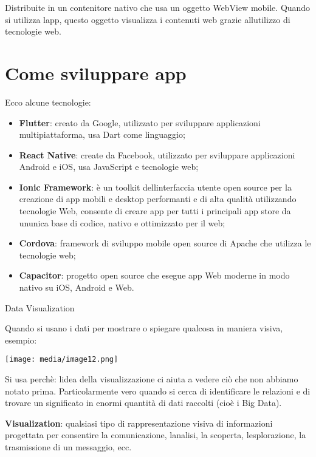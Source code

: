 Distribuite in un contenitore nativo che usa un oggetto WebView mobile.
Quando si utilizza l\textquotesingle app, questo oggetto visualizza i
contenuti web grazie all\textquotesingle utilizzo di tecnologie web.

\section{Come sviluppare app}\label{come-sviluppare-app}

Ecco alcune tecnologie:

\begin{itemize}
\item
  \textbf{Flutter}: creato da Google, utilizzato per sviluppare
  applicazioni multipiattaforma, usa Dart come linguaggio;
\item
  \textbf{React Native}: create da Facebook, utilizzato per sviluppare
  applicazioni Android e iOS, usa JavaScript e tecnologie web;
\item
  \textbf{Ionic Framework}: è un toolkit
  dell\textquotesingle interfaccia utente open source per la creazione
  di app mobili e desktop performanti e di alta qualità utilizzando
  tecnologie Web, consente di creare app per tutti i principali app
  store da un\textquotesingle unica base di codice, nativo e ottimizzato
  per il web;
\item
  \textbf{Cordova}: framework di sviluppo mobile open source di Apache
  che utilizza le tecnologie web;
\item
  \textbf{Capacitor}: progetto open source che esegue app Web moderne in
  modo nativo su iOS, Android e Web.
\end{itemize}

Data Visualization

Quando si usano i dati per mostrare o spiegare qualcosa in maniera
visiva, esempio:

\texttt{[image: media/image12.png]}

Si usa perchè: l\textquotesingle idea della visualizzazione ci aiuta a
vedere ciò che non abbiamo notato prima. Particolarmente vero quando si
cerca di identificare le relazioni e di trovare un significato in enormi
quantità di dati raccolti (cioè i Big Data).

\textbf{Visualization}: qualsiasi tipo di rappresentazione visiva di
informazioni progettata per consentire la comunicazione,
l\textquotesingle analisi, la scoperta, l\textquotesingle esplorazione,
la trasmissione di un messaggio, ecc.

